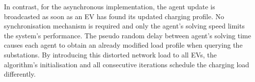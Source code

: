 In contrast, for the asynchronous implementation, the agent update is broadcasted as soon as an EV has found its updated charging profile. No synchronisation mechanism is required and only the agent's solving speed limits the system's performance. The pseudo random delay between agent's solving time causes each agent to obtain an already modified load profile when querying the substations. By introducing this distorted network load to all EVs, the algorithm's initialisation and all consecutive iterations schedule the charging load differently.










